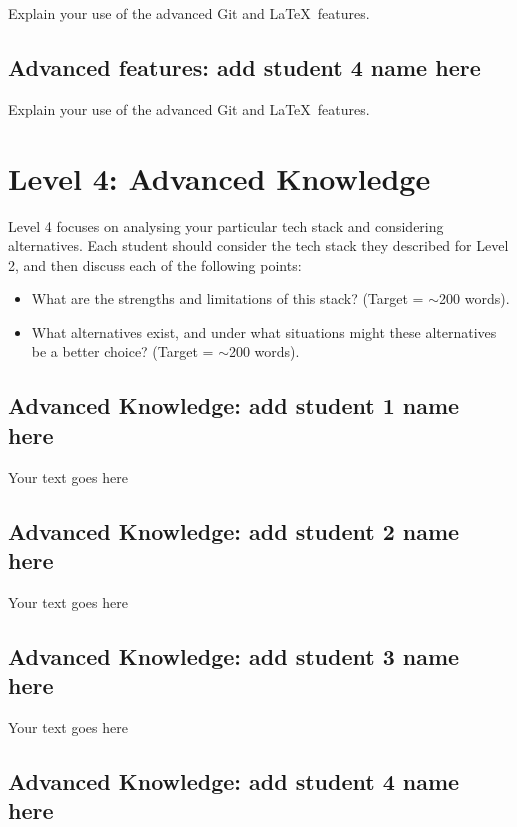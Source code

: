 \documentclass[a4paper, 11pt]{report}
\begin{document}
Explain your use of the advanced Git and \LaTeX\ features. 

\subsection{Advanced features: add student 4 name here}

Explain your use of the advanced Git and \LaTeX\ features. 




\newpage
\section{Level 4: Advanced Knowledge}

Level 4 focuses on analysing your particular tech stack and considering alternatives. Each student should consider the tech stack they described for Level 2, and then discuss each of the following points:
\begin{itemize}
    \item What are the strengths and limitations of this stack? (Target = $\sim$200 words).
    \item What alternatives exist, and under what situations might these alternatives be a better choice? (Target = $\sim$200 words).
\end{itemize}

\subsection{Advanced Knowledge: add student 1 name here}

Your text goes here

\subsection{Advanced Knowledge: add student 2 name here}

Your text goes here

\subsection{Advanced Knowledge: add student 3 name here}

Your text goes here

\subsection{Advanced Knowledge: add student 4 name here}
\end{document}
